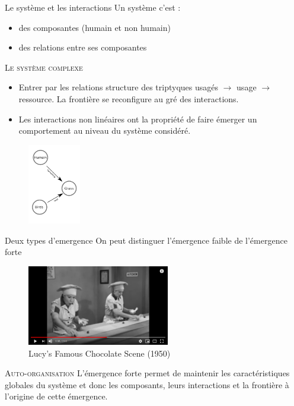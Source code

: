 \documentclass[newPxFont]{beamer}
\begin{document}
\begin{frame}[c]{Le système et les interactions}
\vspace{-1cm}
Un système c'est :
\begin{itemize}
  \item des composantes (humain et non humain)
  \item des relations entre ses composantes
\end{itemize}

\small{
  \begin{alertblock}{\textsc{Le système complexe}}
      \begin{itemize}
        \item Entrer par les relations structure des triptyques usagés $\rightarrow$ usage $\rightarrow$ ressource. La frontière se reconfigure au gré des interactions.
        \item Les interactions non linéaires ont la propriété de faire émerger un comportement au niveau du système considéré.
      \end{itemize}

  \end{alertblock}
}
\begin{figure}
  \includegraphics[height=3.5cm]{img/ReHab_network.png}
\end{figure}

\end{frame}


\begin{frame}[c]{Deux types d'emergence}
\vspace{-1cm}
On peut distinguer l’émergence faible de l’émergence forte

\begin{figure}
  \includegraphics[height=3.5cm]{img/Screenshot_2019-11-18 (143) Lucy's Famous Chocolate Scene - YouTube}
  \caption{Lucy's Famous Chocolate Scene (1950)}
\end{figure}

\small{
  \begin{alertblock}{\textsc{Auto-organisation}}
      L'émergence forte permet de maintenir les caractéristiques globales du système et donc les composants, leurs interactions et la frontière à l’origine de cette émergence.
  \end{alertblock}
}

\end{frame}
\end{document}
